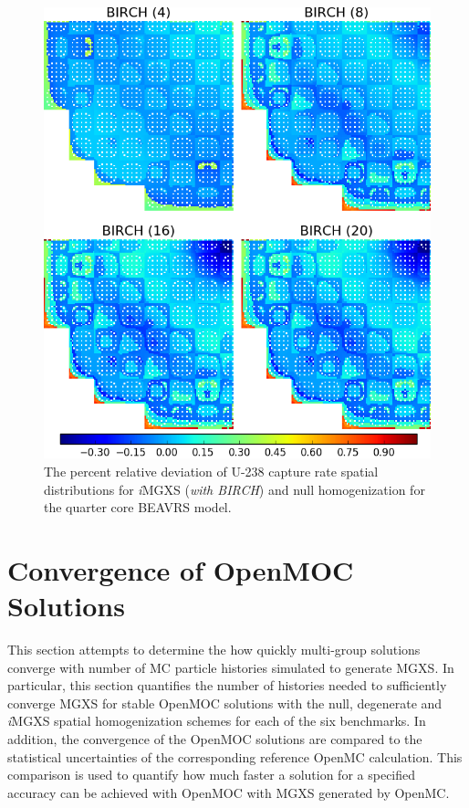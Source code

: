\begin{figure}[h!]
\centering
\includegraphics[width=0.9\linewidth]{figures/results/compare/full-core/compare-capt-birch}
\vspace{2mm}
\caption[U-238 capture rate comparison for the quarter core BEAVRS model]{The percent relative deviation of U-238 capture rate spatial distributions for \textit{i}\ac{MGXS} (\textit{with BIRCH}) and null homogenization for the quarter core BEAVRS model.}
\label{fig:chap11-full-core-capt-rates-birch-comp}
\end{figure}

\clearpage


\section{Convergence of OpenMOC Solutions}
\label{sec:chap11-converge}

This section attempts to determine the how quickly multi-group solutions converge with number of \ac{MC} particle histories simulated to generate \ac{MGXS}. In particular, this section quantifies the number of histories needed to sufficiently converge \ac{MGXS} for stable OpenMOC solutions with the null, degenerate and \textit{i}\ac{MGXS} spatial homogenization schemes for each of the six benchmarks. In addition, the convergence of the OpenMOC solutions are compared to the statistical uncertainties of the corresponding reference OpenMC calculation. This comparison is used to quantify how much faster a solution for a specified accuracy can be achieved with OpenMOC with \ac{MGXS} generated by OpenMC.

